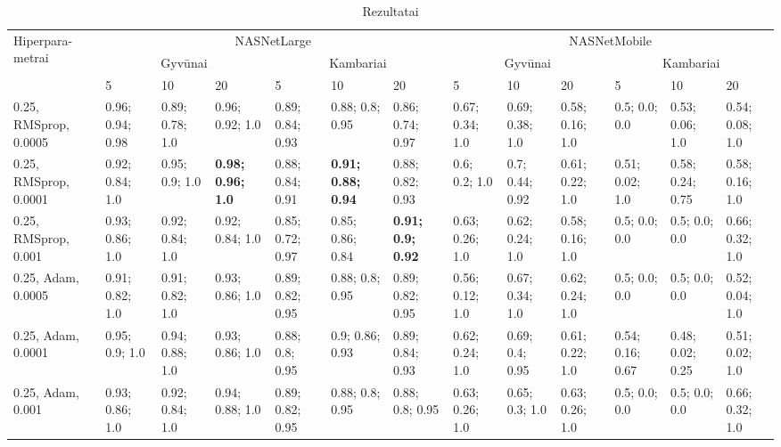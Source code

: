 \documentclass{VUMIFPSbakalaurinis}
\begin{document}
\begin{longtable}{ | p{1.5cm} | p{1cm} | p{1cm} | p{1cm} | p{1cm} | p{1cm} | p{1cm} | p{1cm} | p{1cm} | p{1cm} | p{1cm} | p{1cm} | p{1cm} | }
    \caption{Rezultatai} \\
    \hline
    \multirow{3}{1.5cm}{Hiperpara- metrai} & \multicolumn{6}{c|}{NASNetLarge} & \multicolumn{6}{c|}{NASNetMobile} \\ \cline{2-13}
    & \multicolumn{3}{|c}{Gyvūnai} & \multicolumn{3}{|c}{Kambariai} & \multicolumn{3}{|c}{Gyvūnai} & \multicolumn{3}{|c|}{Kambariai} \\ \cline{2-13}
    & 5 & 10 & 20 & 5 & 10 & 20 & 5 & 10 & 20 & 5 & 10 & 20 \\  \hline
    \endhead
    0.25, RMSprop, 0.0005 & 0.96; 0.94; 0.98 & 0.89; 0.78; 1.0 & 0.96; 0.92; 1.0  &  0.89; 0.84; 0.93 & 0.88; 0.8; 0.95 & 0.86; 0.74; 0.97   &  0.67; 0.34; 1.0 & 0.69; 0.38; 1.0 & 0.58; 0.16; 1.0             &  0.5; 0.0; 0.0 & 0.53; 0.06; 1.0 & 0.54; 0.08; 1.0  \\ \hline
    0.25, RMSprop, 0.0001 & 0.92; 0.84; 1.0 & 0.95; 0.9; 1.0 & \textbf{0.98; 0.96; 1.0}    &  0.88; 0.84; 0.91 & \textbf{0.91; 0.88; 0.94} & 0.88; 0.82; 0.93  &  0.6; 0.2; 1.0 & 0.7; 0.44; 0.92 & 0.61; 0.22; 1.0  &  0.51; 0.02; 1.0 & 0.58; 0.24; 0.75 & 0.58; 0.16; 1.0  \\ \hline
    0.25, RMSprop, 0.001  & 0.93; 0.86; 1.0 & 0.92; 0.84; 1.0 & 0.92; 0.84; 1.0   & 0.85; 0.72; 0.97 & 0.85; 0.86; 0.84 & \textbf{0.91; 0.9; 0.92}    &  0.63; 0.26; 1.0 & 0.62; 0.24; 1.0 & 0.58; 0.16; 1.0    &  0.5; 0.0; 0.0 & 0.5; 0.0; 0.0 & 0.66; 0.32; 1.0  \\ \hline
    0.25, Adam, 0.0005    & 0.91; 0.82; 1.0 & 0.91; 0.82; 1.0 & 0.93; 0.86; 1.0   &  0.89; 0.82; 0.95 & 0.88; 0.8; 0.95 & 0.89; 0.82; 0.95   &  0.56; 0.12; 1.0 & 0.67; 0.34; 1.0 & 0.62; 0.24; 1.0             &  0.5; 0.0; 0.0 & 0.5; 0.0; 0.0 & 0.52; 0.04; 1.0  \\ \hline
    0.25, Adam, 0.0001    & 0.95; 0.9; 1.0 & 0.94; 0.88; 1.0 & 0.93; 0.86; 1.0    &  0.88; 0.8; 0.95 & 0.9; 0.86; 0.93 & 0.89; 0.84; 0.93    &  0.62; 0.24; 1.0 & 0.69; 0.4; 0.95 & 0.61; 0.22; 1.0             &  0.54; 0.16; 0.67 & 0.48; 0.02; 0.25 & 0.51; 0.02; 1.0  \\ \hline
    0.25, Adam, 0.001     & 0.93; 0.86; 1.0 & 0.92; 0.84; 1.0 & 0.94; 0.88; 1.0   &  0.89; 0.82; 0.95 & 0.88; 0.8; 0.95 & 0.88; 0.8; 0.95    &  0.63; 0.26; 1.0 & 0.65; 0.3; 1.0 & 0.63; 0.26; 1.0              &  0.5; 0.0; 0.0 & 0.5; 0.0; 0.0 & 0.66; 0.32; 1.0  \\ \hline

\end{longtable}
\end{document}
